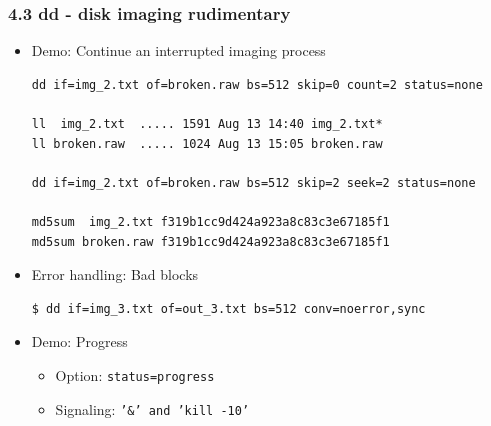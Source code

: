 \begin{frame}[fragile]
  \frametitle{4.3 dd - disk imaging rudimentary}
    \begin{itemize}
        \item[] Demo: Continue an interrupted imaging process
\begin{lstlisting}[basicstyle=\tiny]
dd if=img_2.txt of=broken.raw bs=512 skip=0 count=2 status=none

ll  img_2.txt  ..... 1591 Aug 13 14:40 img_2.txt*
ll broken.raw  ..... 1024 Aug 13 15:05 broken.raw

dd if=img_2.txt of=broken.raw bs=512 skip=2 seek=2 status=none

md5sum  img_2.txt f319b1cc9d424a923a8c83c3e67185f1
md5sum broken.raw f319b1cc9d424a923a8c83c3e67185f1
\end{lstlisting}
        \item[] Error handling: Bad blocks
\begin{lstlisting}[basicstyle=\tiny]
$ dd if=img_3.txt of=out_3.txt bs=512 conv=noerror,sync
\end{lstlisting}
        \item[] Demo: Progress
        \begin{itemize}
            \item[] Option: \texttt{status=progress}
            \item[] Signaling: \texttt{'\&' and 'kill -10'}
        \end{itemize}
    \end{itemize}
\end{frame}


